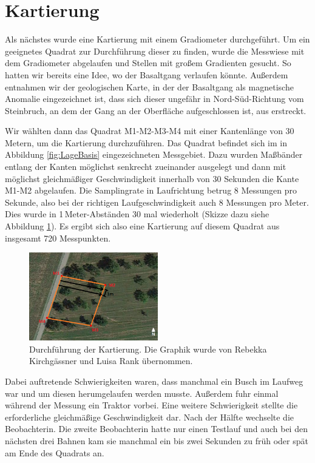 \section{Kartierung}

Als nächstes wurde eine Kartierung mit einem Gradiometer durchgeführt. Um ein geeignetes Quadrat zur Durchführung dieser zu finden, wurde die Messwiese mit dem Gradiometer abgelaufen und Stellen mit großem Gradienten gesucht. So hatten wir bereits eine Idee, wo der Basaltgang verlaufen könnte. Außerdem entnahmen wir der geologischen Karte, in der der Basaltgang als magnetische Anomalie eingezeichnet ist, dass sich dieser ungefähr in Nord-Süd-Richtung vom Steinbruch, an dem der Gang an der Oberfläche aufgeschlossen ist, aus erstreckt.


Wir wählten dann das Quadrat M1-M2-M3-M4 mit einer Kantenlänge von 30 Metern, um die Kartierung durchzuführen. Das Quadrat befindet sich im in Abbildung \ref{fig:LageBasis} eingezeichneten Messgebiet. Dazu wurden Maßbänder entlang der Kanten möglichst senkrecht zueinander ausgelegt und dann mit möglichst gleichmäßiger Geschwindigkeit innerhalb von 30 Sekunden die Kante M1-M2 abgelaufen. Die Samplingrate in Laufrichtung betrug 8 Messungen pro Sekunde, also bei der richtigen Laufgeschwindigkeit auch 8 Messungen pro Meter. Dies wurde in 1\,Meter-Abständen 30 mal wiederholt (Skizze dazu siehe Abbildung \ref{fig:MessungKartierung}). Es ergibt sich also eine Kartierung auf diesem Quadrat aus insgesamt 720 Messpunkten.

\begin{figure}[!ht]
 \centering
 \includegraphics[width=0.5\textwidth]{fig/Kartierunggps}
 \caption[Durchführung der Kartierung]{Durchführung der Kartierung. Die Graphik wurde von Rebekka Kirchgässner und Luisa Rank übernommen.}
 \label{fig:MessungKartierung}
\end{figure}


Dabei auftretende Schwierigkeiten waren, dass manchmal ein Busch im Laufweg war und um diesen herumgelaufen werden musste. Außerdem fuhr einmal während der Messung ein Traktor vorbei. Eine weitere Schwierigkeit stellte die erforderliche gleichmäßige Geschwindigkeit dar. Nach der Hälfte wechselte die Beobachterin. Die zweite Beobachterin hatte nur einen Testlauf und auch bei den nächsten drei Bahnen kam sie manchmal ein bis zwei Sekunden zu früh oder spät am Ende des Quadrats an.

